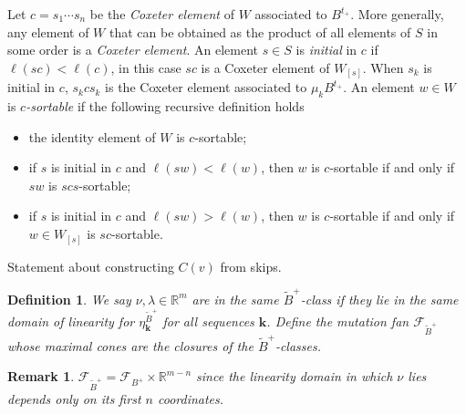 \documentclass{amsart}
\newtheorem{definition}[theorem]{Definition}
\newtheorem{remark}[theorem]{Remark}
\numberwithin{theorem}{section}
\newcommand{\bfk}{{\boldsymbol{k}}}
\newcommand{\cF}{\mathcal{F}}
\newcommand{\RR}{\mathbb{R}}
\begin{document}
  Let $c=s_1\cdots s_n$ be the \emph{Coxeter element} of $W$ associated to $B^{t_+}$.
  More generally, any element of $W$ that can be obtained as the product of all elements of $S$ in some order is a \emph{Coxeter element}.
  An element $s\in S$ is \emph{initial} in $c$ if $\ell(sc)<\ell(c)$, in this case $sc$ is a Coxeter element of $W_{[s]}$.
  When $s_k$ is initial in $c$, $s_k c s_k$ is the Coxeter element associated to $\mu_k B^{t_+}$.
  An element $w\in W$ is \emph{$c$-sortable} if the following recursive definition holds
  \begin{itemize}
    \item the identity element of $W$ is $c$-sortable;
    \item if $s$ is initial in $c$ and $\ell(sw)<\ell(w)$, then $w$ is $c$-sortable if and only if $sw$ is $scs$-sortable;
    \item if $s$ is initial in $c$ and $\ell(sw)>\ell(w)$, then $w$ is $c$-sortable if and only if $w\in W_{[s]}$ is $sc$-sortable.
  \end{itemize}

  Statement about constructing $C(v)$ from skips.

  
  







  \begin{definition}
    We say $\nu,\lambda\in\RR^m$ are in the same \emph{$\widetilde B^+$-class} if they lie in the same domain of linearity for $\eta^{\widetilde B^+}_\bfk$ for all sequences $\bfk$.
    Define the \emph{mutation fan} $\cF_{\widetilde B^+}$ whose maximal cones are the closures of the $\widetilde B^+$-classes.
  \end{definition}
  \begin{remark}
    $\cF_{\widetilde B^+}=\cF_{B^+}\times \RR^{m-n}$ since the linearity domain in which $\nu$ lies depends only on its first $n$ coordinates.
  \end{remark}
\end{document}
